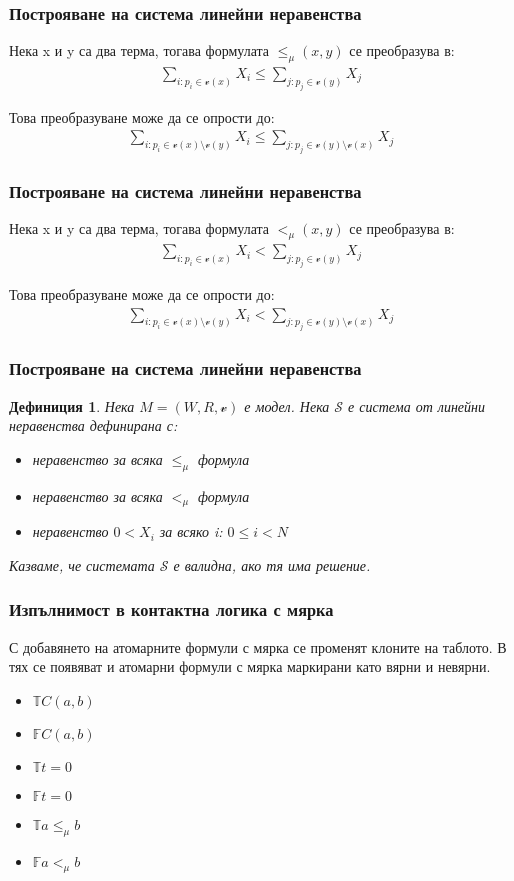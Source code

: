 \documentclass{beamer}
\newtheorem{defn}{Дефиниция}[section]
\newcommand{\vE}{\mathscr{v}}
\newcommand{\signT}{\mathbb{T}}
\newcommand{\signF}{\mathbb{F}}
\begin{document}
\begin{frame}\frametitle{Построяване на система линейни неравенства}
	Нека x и y са два терма, тогава формулата $\le_\mu(x, y)$ се преобразува в:
	\begin{align*}
		\sum_{i: p_i \in \vE(x)} X_i \leq \sum_{j: p_j \in \vE(y)} X_j
	\end{align*}

			Това преобразуване може да се опрости до:
			\begin{align*}
				\sum_{i: p_i \in \vE(x) \setminus \vE(y)} X_i \leq \sum_{j: p_j \in \vE(y) \setminus \vE(x)} X_j
			\end{align*}
\end{frame}

\begin{frame}\frametitle{Построяване на система линейни неравенства}
			Нека x и y са два терма, тогава формулата $<_\mu(x, y)$ се преобразува в:
			\begin{align*}
				\sum_{i: p_i \in \vE(x)} X_i < \sum_{j: p_j \in \vE(y)} X_j
			\end{align*}

			Това преобразуване може да се опрости до:
			\begin{align*}
				\sum_{i: p_i \in \vE(x) \setminus \vE(y)} X_i < \sum_{j: p_j \in \vE(y) \setminus \vE(x)} X_j
			\end{align*}
\end{frame}

\begin{frame}\frametitle{Построяване на система линейни неравенства}
		\begin{defn}
			Нека $M = (W, R, \vE)$ е модел. Нека $\mathscr{S}$ е система от линейни неравенства дефинирана с:
			\begin{itemize}
				\item неравенство за всяка $\le_\mu$ формула
				\item неравенство за всяка $<_\mu$ формула
				\item неравенство $0 < X_i$ за всяко i: $0 \le i < N$  
			\end{itemize}
			Казваме, че системата $\mathscr{S}$ е валидна, ако тя има решение.
		\end{defn}
\end{frame}

\begin{frame}\frametitle{Изпълнимост в контактна логика с мярка}
С добавянето на атомарните формули с мярка се променят клоните на таблото. В тях се появяват и атомарни формули с мярка маркирани като вярни и невярни.
\begin{itemize}
	\item $\signT C(a, b)$
	\item $\signF C(a, b)$ 
	\item $\signT t = 0$
	\item $\signF t = 0$
	\item $\signT a  \le_\mu b$
	\item $\signF a <_\mu b$
\end{itemize}
\end{frame}
\end{document}
